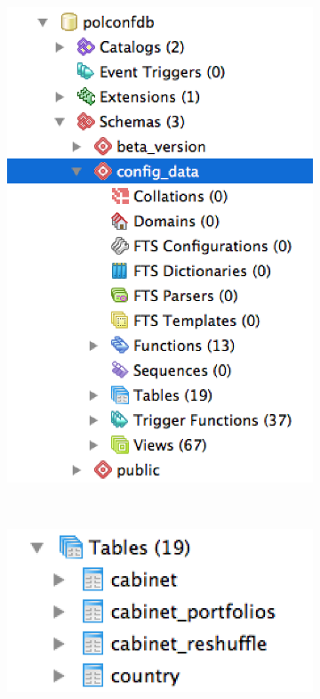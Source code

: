 \begin{figure}[ht!]
\centering
  \begin{subfigure}{.45\textwidth}
  \includegraphics[width=\textwidth,trim= 0 0 0 0, clip]{pcdb_documentation_screenshots/pgadmin3_inside_config_data.png}
    \label{fig_pgadmin3_inside_config_data}
  \end{subfigure}
  ~%
  \begin{subfigure}{.45\textwidth}
  \includegraphics[width=\textwidth,trim= 0 0 0 0, clip]{pcdb_documentation_screenshots/pgadmin3_tables_inside_config_data.png}

\end{subfigure}
\end{figure}
